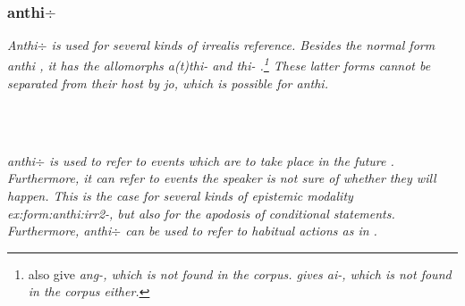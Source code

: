 \subsubsection{anthi$\div$}\label{sec:morph:anthi-}
\em Anthi$\div$ \em is used for several kinds of irrealis reference. Besides the normal form \em anthi \em {}, it has the allomorphs  \em a(t)thi- \em and  \em thi- \em{} \citep[cf.][31]{Adelaar1991}.\footnote{\citet[168]{SmithEtAl2007} also give \em ang-\em, which is not found in the corpus. \citet{Ansaldo2009} gives \em ai-\em, which is not found in the corpus either.} These latter forms cannot be separated from their host by \em jo\em, which is possible for \em anthi\em.

 \\

 
 \\



\em anthi$\div$ \em is used to refer to events which are to take place in the future . Furthermore, it can refer to events the speaker is not sure of whether they will happen. This is the case for several kinds of epistemic modality {ex:form:anthi:irr2}-, but also for the apodosis  of conditional statements. Furthermore, \em anthi$\div$ \em can be used to refer to habitual actions as in .
 



